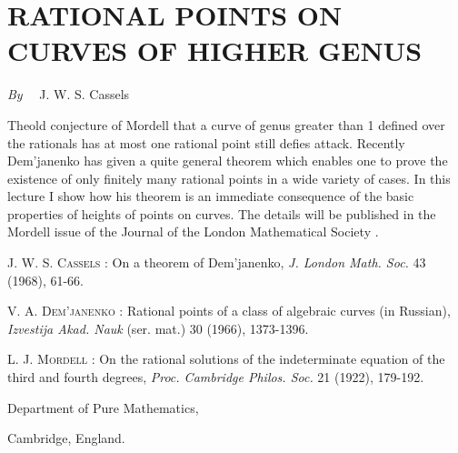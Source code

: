 \chapter[\textsc{J. W. S. Cassels~:} Rational Points on Curves of Higher Genus]{RATIONAL POINTS ON CURVES OF HIGHER GENUS}\label{art06}

\begin{center}
{\em By}~~ J. W. S. Cassels
\end{center}


\setcounter{pageoriginal}{82}
The\pageoriginale old conjecture of Mordell \cite{art06-key3} that a curve of genus greater than 1 defined over the rationals has at most one rational point still defies attack. Recently Dem'janenko \cite{art06-key2} has given a quite general theorem which enables one to prove the existence of only finitely many rational points in a wide variety of cases. In this lecture I show how his theorem is an immediate consequence of the basic properties of heights of points on curves. The details will be published in the Mordell issue of the Journal of the London Mathematical Society \cite{art06-key1}.

\begin{thebibliography}{99}
 \textsc{J. W. S. Cassels :} On a theorem of Dem'janenko, {\em J. London Math. Soc.} 43 (1968), 61-66.

 \textsc{V. A. Dem'janenko :} Rational points of a class of algebraic curves (in Russian), {\em Izvestija Akad. Nauk} (ser. mat.) 30 (1966), 1373-1396.

 \textsc{L. J. Mordell :} On the rational solutions of the indeterminate equation of the third and fourth degrees, {\em Proc. Cambridge Philos. Soc.} 21 (1922), 179-192.
\end{thebibliography}

\medskip
\noindent
{\small Department of Pure Mathematics,}

\noindent
{\small Cambridge, England.}
